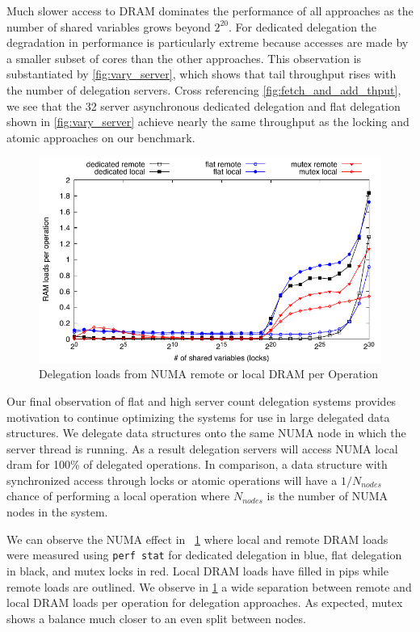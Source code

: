 \documentclass{uicthesi}
\begin{document}
Much slower access to DRAM dominates the performance of all approaches as the number of shared variables grows beyond $2^{20}$. For dedicated delegation the degradation in performance is particularly extreme because accesses are made by a smaller subset of cores than the other approaches. This observation is substantiated by \ref{fig:vary_server}, which shows that tail throughput rises with the number of delegation servers. Cross referencing \ref{fig:fetch_and_add_thput}, we see that the 32 server asynchronous dedicated delegation and flat delegation shown in \ref{fig:vary_server} achieve nearly the same throughput as the locking and atomic approaches on our benchmark. 

\begin{figure}[ht!]
\centering
\includegraphics[width=0.9\columnwidth]{FIG/ram_accesses_per_op.pdf}
\caption{Delegation loads from NUMA remote or local DRAM per Operation}
\label{fig:ram_loads}
\end{figure}

Our final observation of flat and high server count delegation systems provides motivation to continue optimizing the systems for use in large delegated data structures. We delegate data structures onto the same NUMA node in which the server thread is running. As a result delegation servers will access NUMA local dram for 100\% of delegated operations. In comparison, a data structure with synchronized access through locks or atomic operations will have a $1/N_{nodes}$ chance of performing a local operation where $N_{nodes}$ is the number of NUMA nodes in the system. 

We can observe the NUMA effect in ~\ref{fig:ram_loads} where local and remote DRAM loads were measured using  \texttt{perf stat} for dedicated delegation in blue, flat delegation in black, and mutex locks in red. Local DRAM loads have filled in pips while remote loads are outlined. We observe in \ref{fig:ram_loads} a wide separation between remote and local DRAM loads per operation for delegation approaches. As expected, mutex shows a balance much closer to an even split between nodes. 
\end{document}
